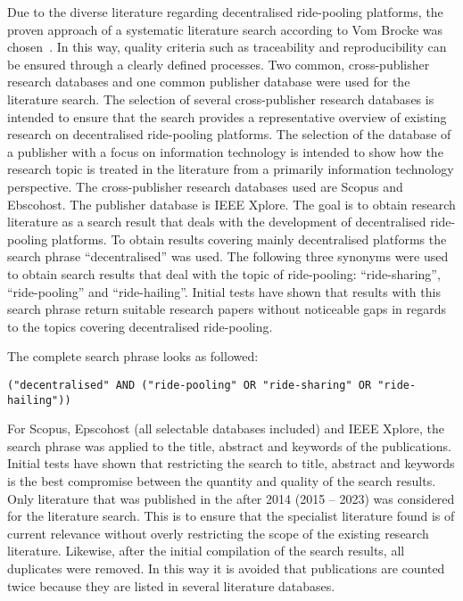 Due to the diverse literature regarding decentralised ride-pooling platforms, the proven approach of a systematic literature search according to Vom Brocke was chosen~\cite{vomBrocke.2009}. In this way, quality criteria such as traceability and reproducibility can be ensured through a clearly defined processes. Two common, cross-publisher research databases and one common publisher database were used for the literature search.
The selection of several cross-publisher research databases is intended to ensure that the search provides a representative overview of existing research on decentralised ride-pooling platforms. The selection of the database of a publisher with a focus on information technology is intended to show how the research topic is treated in the literature from a primarily information technology perspective. The cross-publisher research databases used are Scopus and Ebscohost. The publisher database is IEEE Xplore.
The goal is to obtain research literature as a search result that deals with the development of decentralised ride-pooling platforms. To obtain results covering mainly decentralised platforms the search phrase ``decentralised'' was used. The following three synonyms were used to obtain search results that deal with the topic of ride-pooling: ``ride-sharing'', ``ride-pooling'' and ``ride-hailing''. Initial tests have shown that results with this search phrase return suitable research papers without noticeable gaps in regards to the topics covering decentralised ride-pooling.

The complete search phrase looks as followed:
\begin{verbatim}
("decentralised" AND ("ride-pooling" OR "ride-sharing" OR "ride-hailing"))
\end{verbatim}

For Scopus, Epscohost (all selectable databases included) and IEEE Xplore, the search phrase was applied to the title, abstract and keywords of the publications. Initial tests have shown that restricting the search to title, abstract and keywords is the best compromise between the quantity and quality of the search results. Only literature that was published in the after 2014 (2015 – 2023) was considered for the literature search. This is to ensure that the specialist literature found is of current relevance without overly restricting the scope of the existing research literature. Likewise, after the initial compilation of the search results, all duplicates were removed. In this way it is avoided that publications are counted twice because they are listed in several literature databases.

